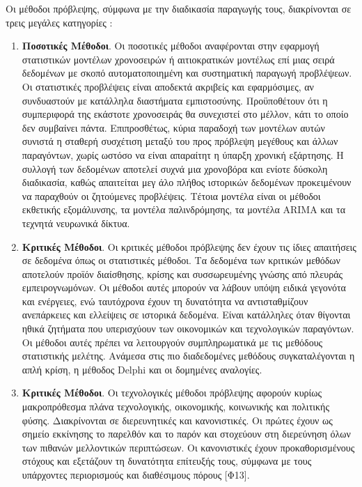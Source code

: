 \documentclass[diploma]{softlab-thesis}
\begin{document}
Οι μέθοδοι πρόβλεψης, σύμφωνα με την διαδικασία παραγωγής τους, διακρίνονται σε τρεις μεγάλες κατηγορίες :
\begin{enumerate}
\item \textbf{Ποσοτικές Μέθοδοι}. Οι ποσοτικές μέθοδοι αναφέρονται στην εφαρμογή στατιστικών μοντέλων χρονοσειρών ή αιτιοκρατικών μοντέλως επί μιας σειρά δεδομένων με σκοπό αυτοματοποιημένη και συστηματική παραγωγή προβλέψεων. Οι στατιστικές προβλέψεις είναι αποδεκτά ακριβείς και εφαρμόσιμες, αν συνδυαστούν με κατάλληλα διαστήματα εμπιστοσύνης. Προϋποθέτουν ότι η συμπεριφορά της εκάστοτε χρονοσειράς θα συνεχιστεί στο μέλλον, κάτι το οποίο δεν συμβαίνει πάντα. Επιπροσθέτως, κύρια παραδοχή των μοντέλων αυτών συνιστά η σταθερή συσχέτιση μεταξύ του προς πρόβλεψη μεγέθους και άλλων παραγόντων, χωρίς ωστόσο να είναι απαραίτητ η ύπαρξη χρονική εξάρτησης. Η συλλογή των δεδομένων αποτελεί συχνά μια χρονοβόρα και ενίοτε δύσκολη διαδικασία, καθώς απαιτείται μεγ
άλο πλήθος ιστορικών δεδομένων προκειμένουν να παραχθούν οι ζητούμενες προβλέψεις. Τέτοια μοντέλα είναι οι μέθοδοι εκθετικής εξομάλυνσης, τα μοντέλα παλινδρόμησης, τα μοντέλα ARIMA και τα τεχνητά νευρωνικά δίκτυα. 
\item \textbf{Κριτικές Μέθοδοι}. Οι κριτικές μέθοδοι πρόβλεψης δεν έχουν τις ίδιες απαιτήσεις σε
δεδομένα όπως οι στατιστικές μέθοδοι. Τα δεδομένα των κριτικών μεθόδων αποτελούν προϊόν διαίσθησης, κρίσης και συσσωρευμένης γνώσης από πλευράς εμπειρογνωμόνων. Οι μέθοδοι αυτές μπορούν να λάβουν υπόψη ειδικά γεγονότα και ενέργειες, ενώ ταυτόχρονα έχουν τη δυνατότητα να αντισταθμίζουν ανεπάρκειες και ελλείψεις σε ιστορικά δεδομένα. Είναι κατάλληλες όταν θίγονται ηθικά ζητήματα που υπερισχύουν των οικονομικών και τεχνολογικών παραγόντων. Οι μέθοδοι αυτές πρέπει να λειτουργούν συμπληρωματικά με τις μεθόδους στατιστικής μελέτης. Ανάμεσα στις πιο διαδεδομένες μεθόδους συγκαταλέγονται η απλή κρίση, η μέθοδος Delphi και οι δομημένες αναλογίες.
\item \textbf{Κριτικές Μέθοδοι}. Οι τεχνολογικές μέθοδοι πρόβλεψης αφορούν κυρίως μακροπρόθεσμα πλάνα τεχνολογικής, οικονομικής, κοινωνικής και πολιτικής φύσης. Διακρίνονται σε διερευνητικές και κανονιστικές. Οι πρώτες έχουν ως σημείο εκκίνησης το παρελθόν και το παρόν και στοχεύουν στη διερεύνηση όλων των πιθανών μελλοντικών περιπτώσεων. Οι κανονιστικές έχουν προκαθορισμένους στόχους και εξετάζουν τη δυνατότητα επίτευξής τους, σύμφωνα με τους υπάρχοντες περιορισμούς και διαθέσιμους πόρους [Φ13].
\end{enumerate}
\end{document}
